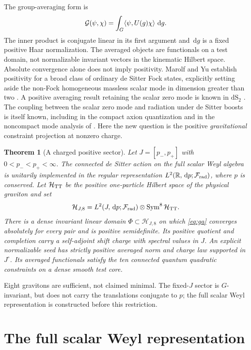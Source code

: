 \documentclass[11pt]{article}
\newtheorem{theorem}{Theorem}
\newcommand{\HH}{\mathcal H}
\newcommand{\FF}{\mathcal F}
\newcommand{\Sym}{\operatorname{Sym}}
\newcommand{\dd}{\,\mathrm d}
\numberwithin{equation}{section}
\begin{document}
The group-averaging form is
\begin{equation}
 {\cal G}(\psi,\chi)=\int_G
             \langle\psi,U(g)\chi\rangle\,\dd g .
 \label{eq:ga}
\end{equation}
The inner product is conjugate linear in its first argument and
\(\dd g\) is a fixed positive Haar normalization. The averaged objects
are functionals on a test domain, not normalizable invariant vectors
in the kinematic Hilbert space. Absolute convergence alone does not
imply positivity. Marolf and Yu establish positivity for a broad class
of ordinary de Sitter Fock states, explicitly setting aside the
non-Fock homogeneous massless scalar mode in dimension greater than
two \cite[Sec.~6]{my}. A positive averaging result retaining the
scalar zero mode is known in \(\mathrm{dS}_2\) \cite{mm2}.
The coupling between the scalar zero mode and radiation under de
Sitter boosts is itself known, including in the compact axion
quantization \cite[Secs.~2.3--2.6]{axion} and in the noncompact
mode analysis of \cite[Sec.~II, Eqs.~(31)--(40)]{gh}. Here the new question is the positive
\emph{gravitational} constraint projection at nonzero charge.

\begin{theorem}[A charged positive sector]\label{thm:main}
Let \(J=[p_-,p_+]\) with \(0<p_-<p_+<\infty\).
The connected de Sitter action on the full scalar Weyl algebra is
unitarily implemented in the regular representation
\(L^2(\mathbb R,\dd p;\FF_{\rm rad})\), where \(p\) is conserved.
Let \(\HH_{\rm TT}\) be the positive one-particle Hilbert space
of the physical graviton and set
\[
 \HH_{J,8}
 =L^2(J,\dd p;\FF_{\rm rad})\otimes \Sym^8\HH_{\rm TT}.
\]
There is a dense invariant linear domain \(\Phi\subset\HH_{J,8}\)
on which \eqref{eq:ga} converges absolutely for every pair and is
positive semidefinite. Its positive quotient and completion carry a
self-adjoint shift charge with spectral values in \(J\). An explicit
normalizable seed has strictly positive averaged norm and charge law
supported in \(J^\circ\). Its averaged functionals satisfy the ten
connected quantum quadratic constraints on a dense smooth test core.
\end{theorem}

Eight gravitons are sufficient, not claimed minimal.
The fixed-\(J\) sector is \(G\)-invariant, but does not carry
the translations conjugate to \(p\); the full scalar Weyl
representation is constructed before this restriction.

\section{The full scalar Weyl representation}
\end{document}
